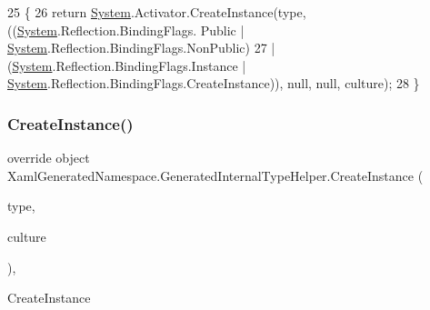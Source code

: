 \begin{DoxyCode}
25                                                                                                            
        \{
26             \textcolor{keywordflow}{return} \hyperlink{namespaceSystem}{System}.Activator.CreateInstance(type, ((\hyperlink{namespaceSystem}{System}.Reflection.BindingFlags.
      Public | \hyperlink{namespaceSystem}{System}.Reflection.BindingFlags.NonPublic) 
27                             | (\hyperlink{namespaceSystem}{System}.Reflection.BindingFlags.Instance | 
      \hyperlink{namespaceSystem}{System}.Reflection.BindingFlags.CreateInstance)), null, null, culture);
28         \}
\end{DoxyCode}
\mbox{\label{classXamlGeneratedNamespace_1_1GeneratedInternalTypeHelper_aefb7a98fceb9c287cef4756942f441d1}} 
\subsubsection{\texorpdfstring{Create\+Instance()}{CreateInstance()}\hspace{0.1cm}{\footnotesize\ttfamily [3/3]}}
{\footnotesize\ttfamily override object Xaml\+Generated\+Namespace.\+Generated\+Internal\+Type\+Helper.\+Create\+Instance (\begin{DoxyParamCaption}\item[{System.\+Type}]{type,  }\item[{System.\+Globalization.\+Culture\+Info}]{culture }\end{DoxyParamCaption})\hspace{0.3cm}{\ttfamily [inline]}, {\ttfamily [protected]}}



Create\+Instance 


